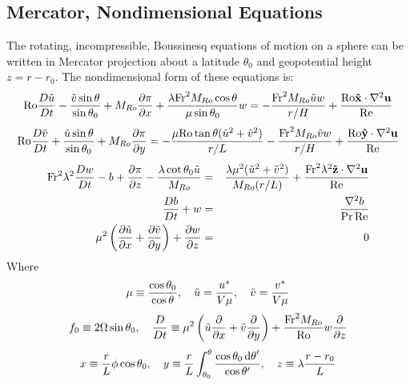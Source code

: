 \subsection{Mercator, Nondimensional Equations}
The rotating, incompressible, Boussinesq equations of motion
\cite{Gill1982} on a sphere can be written in Mercator projection
about a latitude $\theta_0$ and geopotential height $z=r-r_0$.  The
nondimensional form of these equations is:
\begin{equation}
\BFKRo\BFKDt\BFKtu- \frac{\BFKtv
  \sin\theta}{\sin\theta_0}+\BFKMr\BFKpd{x}{\pi}
+\frac{\lambda\BFKFr^2\BFKMr\cos \theta}{\mu\sin\theta_0} w
= -\frac{\BFKFr^2\BFKMr \BFKtu w}{r/H}
+\frac{\BFKRo{\bf \hat x}\cdot\nabla^2{\bf u}}{\BFKRe}
\end{equation}
\begin{equation}
\BFKRo\BFKDt\BFKtv+
\frac{\BFKtu\sin\theta}{\sin\theta_0}+\BFKMr\BFKpd{y}{\pi}
= -\frac{\mu\BFKRo\tan\theta(\BFKtu^2+\BFKtv^2)}{r/L} 
-\frac{\BFKFr^2\BFKMr \BFKtv w}{r/H}
+\frac{\BFKRo{\bf \hat y}\cdot\nabla^2{\bf u}}{\BFKRe}
\end{equation}
\begin{eqnarray}
\BFKFr^2\lambda^2\BFKDt w -b+\BFKpd{z}{\pi}
-\frac{\lambda\cot \theta_0 \BFKtu}{\BFKMr}
& = & \frac{\lambda\mu^2(\BFKtu^2+\BFKtv^2)}{\BFKMr(r/L)}
+\frac{\BFKFr^2\lambda^2{\bf \hat z}\cdot\nabla^2{\bf u}}{\BFKRe} \\
\BFKDt b+w & = & \frac{\nabla^2 b}{\Pr\BFKRe}\nonumber \\
\mu^2\left(\BFKpd x\BFKtu  + \BFKpd y\BFKtv \right)+\BFKpd z w 
& = & 0
\end{eqnarray}
Where 
\begin{equation}
\mu\equiv\frac{\cos\theta_0}{\cos\theta},\ \ \
\BFKtu=\frac{u^*}{V\mu},\ \ \  \BFKtv=\frac{v^*}{V\mu}
\end{equation}
\begin{equation}
f_0\equiv2\Omega\sin\theta_0,\ \ \  
\frac{D}{Dt}  \equiv \mu^2\left(\BFKtu\frac{\partial}{\partial x}  
+\BFKtv \frac{\partial}{\partial y}  \right)
+\frac{\BFKFr^2\BFKMr}{\BFKRo} w\frac{\partial}{\partial z}
\end{equation}
\begin{equation}
x\equiv \frac{r}{L} \phi \cos \theta_0, \ \ \   
y\equiv \frac{r}{L} \int_{\theta_0}^\theta
\frac{\cos \theta_0 \BFKd \theta'}{\cos\theta'}, \ \ \   
z\equiv \lambda\frac{r-r_0}{L}
\end{equation}
